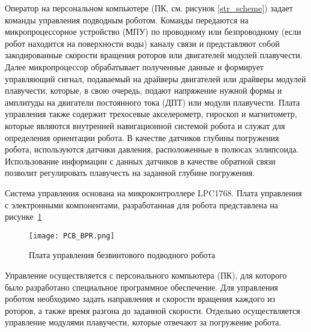 Оператор на персональном компьютере (ПК, см. рисунок \ref{str_scheme}) задает команды управления подводным роботом. Команды передаются на микропроцессорное устройство (МПУ) по проводному или безпроводному (если робот находится на поверхности воды) каналу связи и представляют собой закодированные скорости вращения роторов или двигателей модулей плавучести. Далее микропроцессор обрабатывает полученные данные и формирует управляющий сигнал, подаваемый на драйверы двигателей или драйверы модулей плавучести, которые, в свою очередь, подают напряжение нужной формы и амплитуды на двигатели постоянного тока (ДПТ) или модули плавучести. Плата управления также содержит трехосевые акселерометр, гироскоп и магнитометр, которые являются внутренней навигационной системой робота и служат для определения ориентации робота. В качестве датчиков глубины погружения робота, используются датчики давления, расположенные в полюсах эллипсоида. Использование информации с данных датчиков в качестве обратной связи позволит регулировать плавучесть на заданной глубине погружения.


Система управления основана на микроконтроллере LPC1768. Плата управления с электронными компонентами, разработанная для робота представлена на рисунке~\ref{PCB_BPR}

\begin{figure}[h!]
	\begin{center}
		\texttt{[image: PCB\_BPR.png]}
		\caption{Плата управления безвинтового подводного робота} \label{PCB_BPR}
	\end{center}
\end{figure}

Управление осуществляется с персонального компьютера (ПК), для которого было разработано специальное программное обеспечение. Для управления роботом необходимо задать направления и скорости вращения каждого из роторов, а также время разгона до заданной скорости. Отдельно осуществляется управление модулями плавучести, которые отвечают за погружение робота.



\clearpage